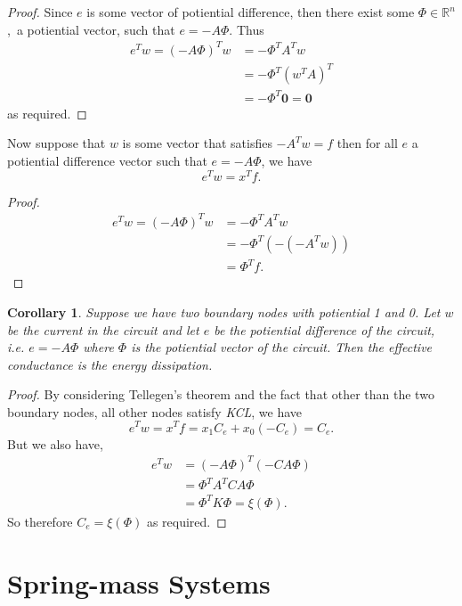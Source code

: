 \documentclass[]{article}
\newtheorem{corollary}{Corollary}[theorem]
\begin{document}
\begin{proof}
Since $e$ is some vector of potiential difference, then there exist some $\Phi \in \mathbb{R}^n$, a potiential 
vector, such that $e = -A\Phi$. Thus
\begin{align*}
e^T w = (- A\Phi)^T w & = - \Phi^T A^T w \\
& = - \Phi^T (w^T A)^T\\
& = - \Phi^T \mathbf{0} = \mathbf{0}
\end{align*}
as required.
\end{proof}

Now suppose that \(w\) is some vector that satisfies \(-A^T w = f\) then
for all \(e\) a potiential difference vector such that \(e = -A\Phi\),
we have \[
e^T w = x^T f.
\]

\begin{proof}
\begin{align*}
e^T w = (- A\Phi)^T w &= - \Phi^T A^T w \\
& = - \Phi^T (- (- A^T w))\\
& = \Phi^T f. 
\end{align*}
\end{proof}

\begin{corollary}
Suppose we have two boundary nodes with potiential 1 and 0. Let $w$ be the current in the circuit 
and let $e$ be the potiential difference of the circuit, i.e. $e = -A\Phi$ where $\Phi$ is the potiential 
vector of the circuit. Then the effective conductance is the energy dissipation.
\end{corollary}

\begin{proof}
By considering Tellegen's theorem and the fact that other than the two boundary nodes, all other nodes 
satisfy \textit{KCL}, we have
$$
e^T w = x^T f = x_1 C_e + x_0 (-C_e) = C_e.
$$
But we also have, 
\begin{align*}
e^T w & = (-A\Phi)^T(-CA\Phi)\\
& = \Phi^T A^T CA\Phi\\
& = \Phi^T K \Phi = \xi(\Phi).
\end{align*}
So therefore $C_e = \xi(\Phi)$ as required.
\end{proof}

\section{Spring-mass Systems}\label{spring-mass-systems}
\end{document}
